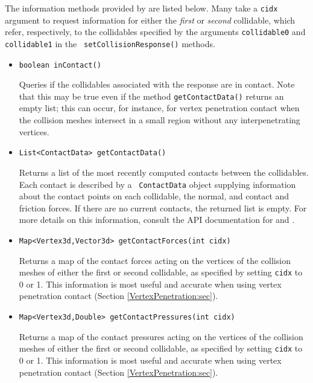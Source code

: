 The information methods provided by 
are listed below. Many take a {\tt cidx} argument to request
information for either the {\it first} or {\it second} collidable,
which refer, respectively, to the collidables specified by the
arguments {\tt collidable0} and {\tt collidable1} in the {\tt
setCollisionResponse()} methods.

\begin{itemize}

\item {\tt boolean inContact()}

Queries if the collidables associated with the response are in
contact.  Note that this may be true even if the method {\tt getContactData()}
returns an empty list; this can occur, for instance, for vertex
penetration contact when the collision meshes intersect in a small
region without any interpenetrating vertices.

\item {\tt List<ContactData> getContactData()}

Returns a list of the most recently computed contacts between the
collidables. Each contact is described by a {\tt
ContactData} object supplying information about the contact
points on each collidable, the normal, and contact and friction
forces.  If there are no current contacts, the returned list is empty.
For more details on this information, consult the API documentation
for
 and
.

\item {\tt Map<Vertex3d,Vector3d> getContactForces(int cidx)}

Returns a map of the contact forces acting on the vertices of the
collision meshes of either the first or second collidable, as
specified by setting {\tt cidx} to 0 or 1. This information is most
useful and accurate when using vertex penetration contact
(Section \ref{VertexPenetration:sec}).

\item {\tt Map<Vertex3d,Double> getContactPressures(int cidx)}

Returns a map of the contact pressures acting on the vertices of
the collision meshes of either the first or second collidable, as
specified by setting {\tt cidx} to 0 or 1.  This information is most
useful and accurate when using vertex penetration contact
(Section \ref{VertexPenetration:sec}).


\end{itemize}
